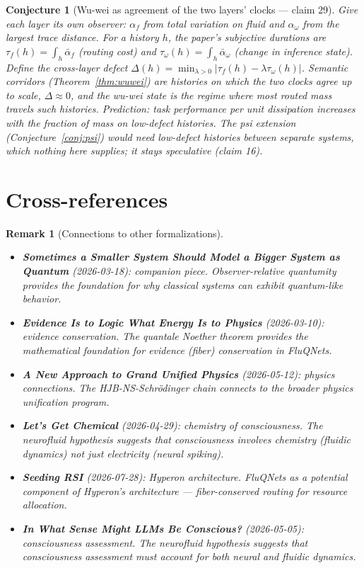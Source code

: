 \documentclass[11pt,a4paper]{article}
\newtheorem{conjecture}[definition]{Conjecture}
\newtheorem{remark}[definition]{Remark}
\begin{document}
\begin{conjecture}[Wu-wei as agreement of the two layers' clocks --- claim 29]
\label{conj:v2-wuwei}
Give each layer its own observer: $\alpha_f$ from total variation on fluid
and $\alpha_\omega$ from the largest trace distance. For a history $h$, the
paper's subjective durations are $\tau_f(h)=\int_h\bar\alpha_f$ (routing cost)
and $\tau_\omega(h)=\int_h\bar\alpha_\omega$ (change in inference state). Define
the cross-layer defect $\Delta(h)=\min_{\lambda>0}|\tau_f(h)-\lambda\tau_\omega(h)|$.
Semantic corridors (Theorem~\ref{thm:wuwei}) are histories on which the two
clocks agree up to scale, $\Delta\approx0$, and the wu-wei state is the regime
where most routed mass travels such histories. Prediction: task performance
per unit dissipation increases with the fraction of mass on low-defect
histories. The psi extension (Conjecture~\ref{conj:psi}) would need
low-defect histories \emph{between} separate systems, which nothing here
supplies; it stays speculative (claim 16).
\end{conjecture}

\section{Cross-references}

\begin{remark}[Connections to other formalizations]
\begin{itemize}
\item \textbf{Sometimes a Smaller System Should Model a Bigger System
  as Quantum} (2026-03-18): companion piece. Observer-relative
  quantumity provides the foundation for why classical systems can
  exhibit quantum-like behavior.
\item \textbf{Evidence Is to Logic What Energy Is to Physics}
  (2026-03-10): evidence conservation. The quantale Noether theorem
  provides the mathematical foundation for evidence (fiber) conservation
  in FluQNets.
\item \textbf{A New Approach to Grand Unified Physics} (2026-05-12):
  physics connections. The HJB-NS-Schr\"odinger chain connects to
  the broader physics unification program.
\item \textbf{Let's Get Chemical} (2026-04-29): chemistry of
  consciousness. The neurofluid hypothesis suggests that consciousness
  involves chemistry (fluidic dynamics) not just electricity (neural
  spiking).
\item \textbf{Seeding RSI} (2026-07-28): Hyperon architecture.
  FluQNets as a potential component of Hyperon's architecture ---
  fiber-conserved routing for resource allocation.
\item \textbf{In What Sense Might LLMs Be Conscious?} (2026-05-05):
  consciousness assessment. The neurofluid hypothesis suggests that
  consciousness assessment must account for both neural and fluidic
  dynamics.
\end{itemize}
\end{remark}
\end{document}
